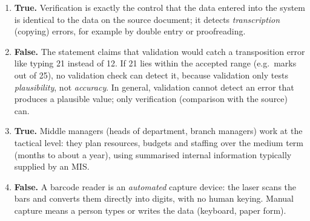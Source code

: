 \documentclass[11pt]{article}
\newcommand{\cle}[1]{{\popxbold\color{popdark}#1}}
\begin{document}
\begin{corrige}
\begin{enumerate}
\item \textbf{True.} \cle{Verification} is exactly the control that the data entered into the system is identical to the data on the source document; it detects \emph{transcription} (copying) errors, for example by double entry or proofreading.
\item \textbf{False.} The statement claims that validation would catch a transposition error like typing 21 instead of 12. If 21 lies within the accepted range (e.g.\ marks out of 25), no validation check can detect it, because validation only tests \emph{plausibility}, not \emph{accuracy}. In general, validation cannot detect an error that produces a plausible value; only verification (comparison with the source) can.
\item \textbf{True.} Middle managers (heads of department, branch managers) work at the \cle{tactical} level: they plan resources, budgets and staffing over the medium term (months to about a year), using summarised internal information typically supplied by an MIS.
\item \textbf{False.} A barcode reader is an \emph{automated} capture device: the laser scans the bars and converts them directly into digits, with no human keying. Manual capture means a person types or writes the data (keyboard, paper form).
\end{enumerate}
\end{corrige}
\end{document}
